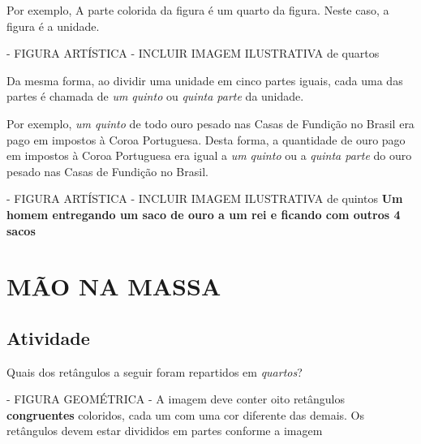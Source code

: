 \documentclass[a4,12pt]{book}
\begin{document}
Por exemplo,
A parte colorida da figura é um quarto da figura. Neste caso, a figura é a unidade.


\begin{imagem*}[breakable]{}{}   - FIGURA ARTÍSTICA - INCLUIR IMAGEM ILUSTRATIVA de quartos
   \end{imagem*}

Da mesma forma, ao dividir uma unidade em cinco partes iguais, cada uma das partes é chamada de {\it um quinto} ou {\it quinta parte} da unidade.

Por exemplo,
{\it um quinto} de todo ouro pesado nas Casas de Fundição no Brasil era pago em impostos à Coroa Portuguesa. Desta forma, a quantidade de ouro pago em impostos à Coroa Portuguesa era igual a {\it um quinto} ou a {\it quinta parte} do ouro pesado nas Casas de Fundição no Brasil.

\begin{imagem*}[breakable]{}{}   - FIGURA ARTÍSTICA - INCLUIR IMAGEM ILUSTRATIVA de quintos
  {\bf Um homem entregando um saco de ouro a um rei e ficando com outros 4 sacos}
\end{imagem*}









\section{ MÃO NA MASSA }


\subsection{Atividade}







Quais dos retângulos a seguir foram repartidos em {\it quartos}?

\begin{imagem*}[breakable]{}{}   - FIGURA GEOMÉTRICA - A imagem deve conter oito retângulos   {\bf congruentes}   coloridos, cada um com uma cor diferente das demais. Os retângulos devem estar divididos em partes conforme a imagem

\end{imagem*}
\end{document}
